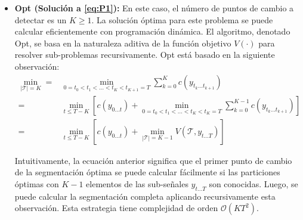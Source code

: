 \documentclass{article}[14pts]
\begin{document}
      \begin{itemize}

        \item \textbf{Opt (Solución a \eqref{eq:P1}):} En este caso, el número de puntos de cambio a detectar es un $K \geq 1$. La solución óptima para este problema se puede calcular eficientemente con programación dinámica. El algoritmo, denotado Opt, se basa en la naturaleza aditiva de la función objetivo $V(\cdot)$ para resolver sub-problemas recursivamente. Opt está basado en la siguiente observación:
          \begin{equation}
            \begin{aligned}
              \min_{|\mathcal{T}|= K} = & \min_{0 = t_{0} < t_{1} < \dots < t_{K} < t_{K+1}= T} \sum_{k= 0}^{K} c(y_{t_{k} \dots t_{k+1}}) \\
                = & \min_{t \leq T-K} \left[ c(y_{0 \dots t}) + \min_{0 = t_{0} < t_{1} < \dots < t_{K} < t_{K}= T} \sum_{k= 0}^{K-1} c(y_{t_{k} \dots t_{k+1}}) \right] \\
                = & \min_{t \leq T-K} \left[ c(y_{0 \dots t}) + \min_{|\mathcal{T}| = K-1} V(\mathcal{T}, y_{t \dots T}) \right]
            \end{aligned}
          \end{equation}

        Intuitivamente, la ecuación anterior significa que el primer punto de cambio de la segmentación óptima se puede calcular fácilmente si las particiones óptimas con $K-1$ elementos de las sub-señales $y_{t \dots T}$ son conocidas. Luego, se puede calcular la segmentación completa aplicando recursivamente esta observación. Esta estrategia tiene complejidad de orden $\mathcal{O}(KT^2)$. 


\end{itemize}
\end{document}

